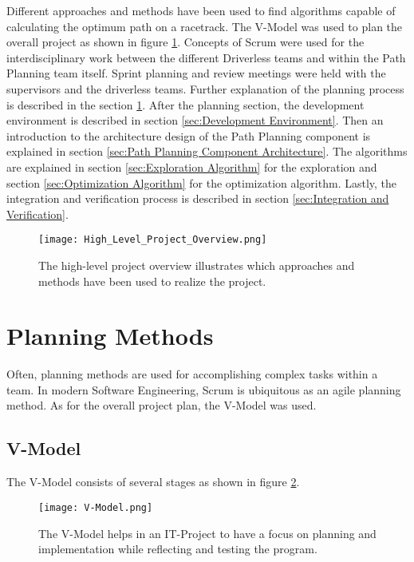 Different approaches and methods have been used to find algorithms capable of calculating the optimum path on a racetrack. The V-Model was used to plan the overall project as shown in figure \ref{fig:High Level Project Overview}. Concepts of Scrum were used for the interdisciplinary work between the different Driverless teams and within the Path Planning team itself. Sprint planning and review meetings were held with the supervisors and the driverless teams. Further explanation of the planning process is described in the section \ref{sec:Planning Methods}. After the planning section, the development environment is described in section \ref{sec:Development Environment}. Then an introduction to the architecture design of the Path Planning component is explained in section \ref{sec:Path Planning Component Architecture}. The algorithms are explained in section \ref{sec:Exploration Algorithm} for the exploration and section \ref{sec:Optimization Algorithm} for the optimization algorithm. Lastly, the integration and verification process is described in section \ref{sec:Integration and Verification}.

\begin{figure}[H]
    \centering
    \texttt{[image: High\_Level\_Project\_Overview.png]}
    \caption{The high-level project overview illustrates which approaches and methods have been used to realize the project.}
    \label{fig:High Level Project Overview}
\end{figure}

\section{Planning Methods} \label{sec:Planning Methods}
Often, planning methods are used for accomplishing complex tasks within a team. In modern Software Engineering, Scrum is ubiquitous as an agile planning method. As for the overall project plan, the V-Model was used.

\subsection{V-Model} \label{sec:Planning Method: V-Model}
The V-Model consists of several stages as shown in figure \ref{fig:V-Model}.
\begin{figure}[H]
    \centering
    \texttt{[image: V-Model.png]}
    \caption{The V-Model helps in an IT-Project to have a focus on planning and implementation while reflecting and testing the program.}
    \label{fig:V-Model}
\end{figure}

